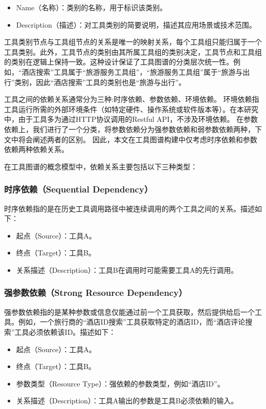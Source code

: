 \begin{itemize}
    \item Name（名称）：类别的名称，用于标识该类别。
    \item Description（描述）：对工具类别的简要说明，描述其应用场景或技术范围。
\end{itemize}

工具类别节点与工具组节点的关系是唯一的映射关系，每个工具组只能归属于一个工具类别。此外，工具节点的类别由其所属工具组的类别决定，工具节点和工具组的类别在逻辑上保持一致。这种设计保证了工具图谱的分类层次统一性。例如，“酒店搜索”工具属于“旅游服务工具组”，“旅游服务工具组”属于“旅游与出行”类别，因此“酒店搜索”工具的类别也是“旅游与出行”。

工具之间的依赖关系通常分为三种\cite{shen2023taskbench}:时序依赖、参数依赖、环境依赖。
环境依赖指工具运行所需的外部环境条件（如特定硬件、操作系统或软件版本等）。在本研究中，由于工具多为通过HTTP协议调用的Restful API，不涉及环境依赖。
在参数依赖上，我们进行了一个分类，将参数依赖分为强参数依赖和弱参数依赖两种，下文中将会阐述两者的区别。
因此，本文在工具图谱构建中仅考虑时序依赖和参数依赖两种依赖关系。

在工具图谱的概念模型中，依赖关系主要包括以下三种类型：

\subsubsection{时序依赖（Sequential Dependency）}
时序依赖指的是在历史工具调用路径中被连续调用的两个工具之间的关系。描述如下：
\begin{itemize}
    \item 起点（Source）：工具A。
    \item 终点（Target）：工具B。
    \item 关系描述（Description）：工具B在调用时可能需要工具A的先行调用。
\end{itemize}

\subsubsection{强参数依赖（Strong Resource Dependency）}
强参数依赖指的是某种参数或信息仅能通过前一个工具获取，然后提供给后一个工具。例如，一个旅行商的“酒店ID搜索”工具获取特定的酒店ID，而“酒店评论搜索”工具必须依赖该ID。描述如下：
\begin{itemize}
    \item 起点（Source）：工具A。
    \item 终点（Target）：工具B。
    \item 参数类型（Resource Type）：强依赖的参数类型，例如``酒店ID''。
    \item 关系描述（Description）：工具A输出的参数是工具B必须依赖的输入。
\end{itemize}

